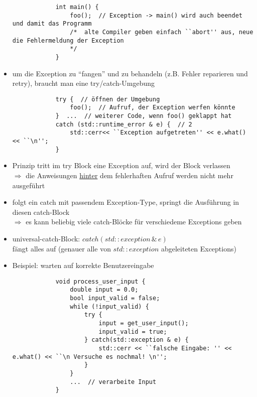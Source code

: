 \documentclass{article}
\begin{document}
\begin{itemize}
\begin{lstlisting}
			int main() {
				foo();  // Exception -> main() wird auch beendet und damit das Programm 
				/*	alte Compiler geben einfach ``abort'' aus, neue die Fehlermeldung der Exception
				*/
			}
		\end{lstlisting}
		\item um die Exception zu ``fangen'' und zu behandeln (z.B. Fehler reparieren und retry), braucht man eine try/catch-Umgebung
		\begin{lstlisting}
			try {  // öffnen der Umgebung
				foo();  // Aufruf, der Exception werfen könnte
			}  ...  // weiterer Code, wenn foo() geklappt hat
			catch (std::runtime_error & e) {  // 2
				std::cerr<< ``Exception aufgetreten'' << e.what() << ``\n'';
			}
		\end{lstlisting}
		\item Prinzip tritt im try Block eine Exception auf, wird der Block verlassen  \\ $\Rightarrow$ die Anweisungen \underline{hinter} dem fehlerhaften Aufruf werden nicht mehr ausgeführt
 		\item folgt ein catch mit passendem Exception-Type, springt die Ausführung in diesen catch-Block \\ $\Rightarrow$ es kann beliebig viele catch-Blöcke für verschiedeme Exceptions geben
 		\item universal-catch-Block: $catch(std::exception \, \& \, e)$ \\
 		fängt alles auf (genauer alle von $std::exception$ abgeleiteten Exceptions)
 		\item Beispiel: warten auf korrekte Benutzereingabe \\
 		\begin{lstlisting}
 			void process_user_input {
 				double input = 0.0;
 				bool input_valid = false;
 				while (!input_valid) {
 					try {
 						input = get_user_input();
 						input_valid = true;
 					} catch(std::exception & e) {
 						std::cerr << ``falsche Eingabe: '' << e.what() << ``\n Versuche es nochmal! \n'';
 					}
 				}
 				...  // verarbeite Input
 			}
 		\end{lstlisting}
	\end{itemize}
\end{document}
